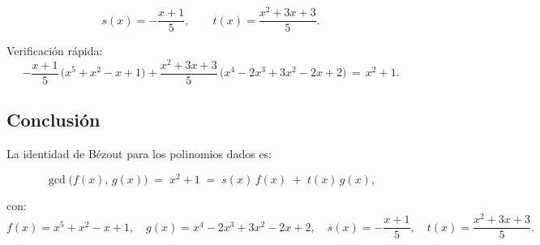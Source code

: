 \documentclass[12pt]{article}
\begin{document}
\[
  s(x) = -\frac{x + 1}{5},\qquad
  t(x) = \frac{x^2 + 3x + 3}{5}.
\]

Verificación rápida:
\[
  -\frac{x + 1}{5}\,\bigl(x^5 + x^2 - x + 1\bigr)
  + \frac{x^2 + 3x + 3}{5}\,\bigl(x^4 - 2x^3 + 3x^2 - 2x + 2\bigr)
  \,=\, x^2 + 1.
\]

\subsection*{Conclusión}

La identidad de Bézout para los polinomios dados es:

\[
  \gcd\bigl(f(x),\,g(x)\bigr) \;=\; x^2 + 1 \;=\; s(x)\,f(x) \;+\; t(x)\,g(x),
\]

con:
\[
  f(x) = x^5 + x^2 - x + 1,\quad
  g(x) = x^4 - 2x^3 + 3x^2 - 2x + 2,\quad
  s(x) = -\frac{x + 1}{5},\quad
  t(x) = \frac{x^2 + 3x + 3}{5}.
\]
\end{document}
